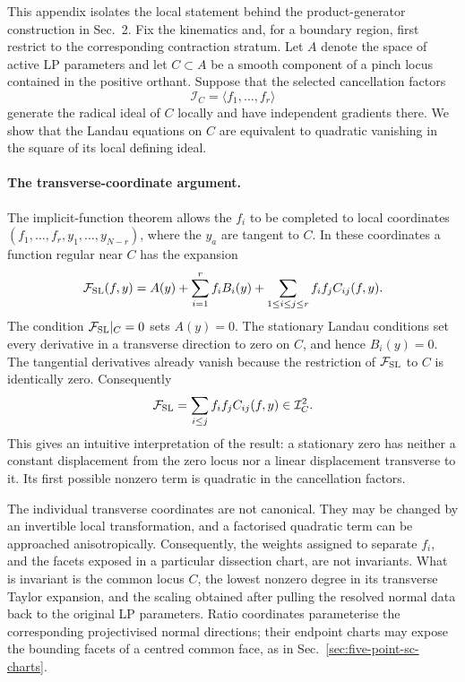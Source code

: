 \documentclass[a4paper,11pt]{article}
\newcommand{\FSL}{\mathcal F_{\rm SL}}
\newcommand{\ideal}{\mathcal I}
\begin{document}
This appendix isolates the local statement behind the product-generator
construction in Sec.~2.  Fix the kinematics and, for a boundary region, first
restrict to the corresponding contraction stratum.  Let \(A\) denote the
space of active LP parameters and let \(C\subset A\) be a smooth
component of a pinch locus contained in the positive orthant.  Suppose that
the selected cancellation factors
\begin{equation}
 \ideal_C=\langle f_1,\ldots,f_r\rangle
 \label{eq:appendix-normal-ideal}
\end{equation}
generate the radical ideal of \(C\) locally and have independent gradients
there.  We show that the Landau equations on \(C\) are equivalent to
quadratic vanishing in the square of its local defining ideal.

\paragraph{The transverse-coordinate argument.}
The implicit-function theorem allows the \(f_i\) to be completed to local
coordinates \((f_1,\ldots,f_r,y_1,\ldots,y_{N-r})\), where the \(y_a\) are
tangent to \(C\).  In these coordinates a function regular near \(C\) has
the expansion
\begin{equation}
 \FSL(f,y)
 =A(y)+\sum_{i=1}^r f_i B_i(y)
  +\sum_{1\leq i\leq j\leq r}f_if_j C_{ij}(f,y).
 \label{eq:normal-Taylor-expansion}
\end{equation}
The condition \(\FSL|_C=0\) sets \(A(y)=0\).  The stationary Landau
conditions set every derivative in a transverse direction to zero on \(C\), and hence
\(B_i(y)=0\).  The tangential derivatives already vanish because the
restriction of \(\FSL\) to \(C\) is identically zero.  Consequently
\begin{equation}
 \FSL
 =\sum_{i\leq j}f_if_j C_{ij}(f,y)
 \in\ideal_C^2.
 \label{eq:normal-Taylor-square}
\end{equation}
This gives an intuitive interpretation of the result: a stationary zero has
neither a constant displacement from the zero locus nor a linear displacement
transverse to it.  Its first possible nonzero term is quadratic in the
cancellation factors.

The individual transverse coordinates are not canonical.  They may be
changed by an invertible local transformation, and a factorised quadratic
term can be approached anisotropically.  Consequently, the weights assigned
to separate \(f_i\), and the facets exposed in a particular dissection chart,
are not invariants.  What is invariant is the common locus \(C\), the lowest
nonzero degree in its transverse Taylor expansion, and the scaling obtained after
pulling the resolved normal data back to the original LP parameters.  Ratio
coordinates parameterise the corresponding projectivised normal directions;
their endpoint charts may expose the bounding facets of a centred common
face, as in Sec.~\ref{sec:five-point-sc-charts}.
\end{document}
